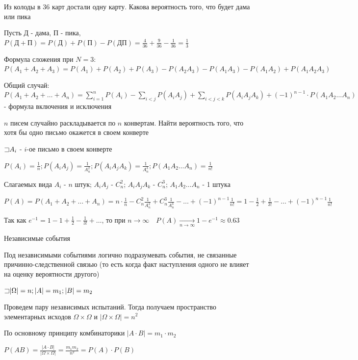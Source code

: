 \documentclass[12pt]{article}
\begin{document}
    \Ex Из колоды в 36 карт достали одну карту. Какова вероятность того, что будет дама или пика

    Пусть Д - дама, П - пика, $P(\text{Д} + \text{П}) = P(\text{Д}) + P(\text{П}) - P(\text{Д}\text{П}) = \frac{4}{36} + \frac{9}{36} - \frac{1}{36} = \frac{1}{3}$

    Формула сложения при $N = 3$: $P(A_1 + A_2 + A_3) = P(A_1) + P(A_2) + P(A_3) - P(A_2 A_3) - P(A_1 A_3) - P(A_1 A_2) + P(A_1 A_2 A_3)$

    Общий случай: $P(A_1 + A_2 + \dots + A_n) =  \sum_{i = 1}^n P(A_i) - \sum_{i < j} P(A_i A_j) + \sum_{i < j < k} P(A_i A_j A_k) + (-1)^{n - 1} \cdot P(A_1 A_2 \dots A_n)$ - формула включения и исключения

    \Ex $n$ писем случайно раскладывается по $n$ конвертам. Найти вероятность того, что хотя бы одно письмо окажется в своем конверте

    $\mathord{\sqsupset} A_i$ - $i$-ое письмо в своем конверте

    $P(A_i) = \frac{1}{n}; P(A_i A_j) = \frac{1}{A^2_n}; P(A_i A_j A_k) = \frac{1}{A^3_n}; P(A_1 A_2 \dots A_n) = \frac{1}{n!}$

    Слагаемых вида $A_i$ - $n$ штук; $A_i A_j$ - $C^2_n$; $A_i A_j A_k$ - $C^3_n$; $A_1 A_2 \dots A_n$ - 1 штука

    $P(A) = P(A_1 + A_2 + \dots + A_n) = n \cdot \frac{1}{n} - C^2_n \frac{1}{A^2_n} + C^3_n \frac{1}{A^3_n} - \dots + (-1)^{n - 1} \frac{1}{n!} = 1 - \frac{1}{2} + \frac{1}{3!} - \dots + (-1)^{n - 1} \frac{1}{n!}$

    Так как $e^{-1} = 1 - 1 + \frac{1}{2} - \frac{1}{3!} + \dots$, то при $n \to \infty \quad P(A) \underset{n \to \infty}{\to} 1 - e^{-1} \approx 0.63$

    Независимые события

    Под независимыми событиями логично подразумевать события, не связанные причинно-следственной связью (то есть когда факт наступления одного не влияет на оценку вероятности другого)

    $\mathord{\sqsupset} |\Omega| = n; |A| = m_1; |B| = m_2$

    Проведем пару независимых испытаний. Тогда получаем пространство элементарных исходов $\Omega \times \Omega$ и $|\Omega \times \Omega| = n^2$

    По основному принципу комбинаторики $|A \cdot B| = m_1 \cdot m_2$

    $P(AB) = \frac{|A \cdot B|}{|\Omega \times \Omega|} = \frac{m_1 m_2}{n^2} = P(A) \cdot P(B)$
\end{document}
